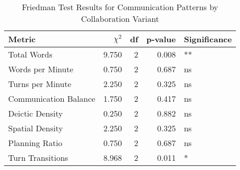 \begin{table}[htbp]
\centering
\caption{Friedman Test Results for Communication Patterns by Collaboration Variant}
\label{tab:communication_friedman_tests}
\begin{tabular}{lrrrl}
\toprule
\textbf{Metric} & \textbf{$\chi^2$} & \textbf{df} & \textbf{p-value} & \textbf{Significance} \\
\midrule
Total Words & 9.750 & 2 & 0.008 & ** \\
Words per Minute & 0.750 & 2 & 0.687 & ns \\
Turns per Minute & 2.250 & 2 & 0.325 & ns \\
Communication Balance & 1.750 & 2 & 0.417 & ns \\
Deictic Density & 0.250 & 2 & 0.882 & ns \\
Spatial Density & 2.250 & 2 & 0.325 & ns \\
Planning Ratio & 0.750 & 2 & 0.687 & ns \\
Turn Transitions & 8.968 & 2 & 0.011 & * \\
\bottomrule
\end{tabular}
\end{table}